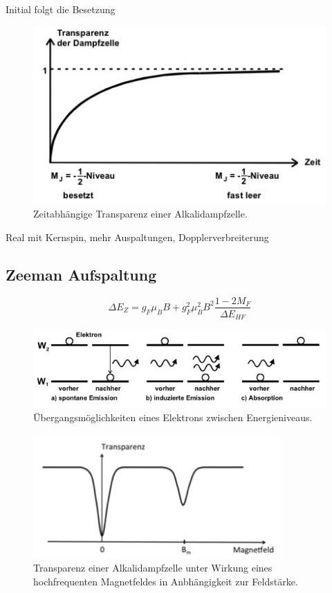 Initial folgt die Besetzung 


\begin{figure}[H]
	\centering
	\includegraphics[width=0.6\linewidth]{content/grafik/transparenz.jpg}
	\caption{Zeitabhängige Transparenz einer Alkalidampfzelle. \cite{pumpen}}
	\label{fig:transparenz}
\end{figure}

Real mit Kernspin, mehr Auspaltungen, Dopplerverbreiterung

\subsection{Zeeman Aufspaltung}

\begin{equation}
	\Delta E_Z = g_F \mu_B B + g_F^2 \mu_B^2 B^2 \frac{1 - 2M_F}{\Delta E_{HF}}
	\label{eqn:quad_zeeman}
\end{equation}

\begin{figure}[H]
	\centering
	\includegraphics[width=0.75\linewidth]{content/grafik/uebergang.jpg}
	\caption{Übergangsmöglichkeiten eines Elektrons zwischen Energieniveaus. \cite{pumpen}}
	\label{fig:uebergang}
\end{figure}

\begin{figure}[H]
	\centering
	\includegraphics[width=0.6\linewidth]{content/grafik/minima.jpg}
	\caption{Transparenz einer Alkalidampfzelle unter Wirkung eines hochfrequenten Magnetfeldes in Anbhängigkeit
			 zur Feldstärke. \cite{pumpen}}
	\label{fig:minima}
\end{figure}

